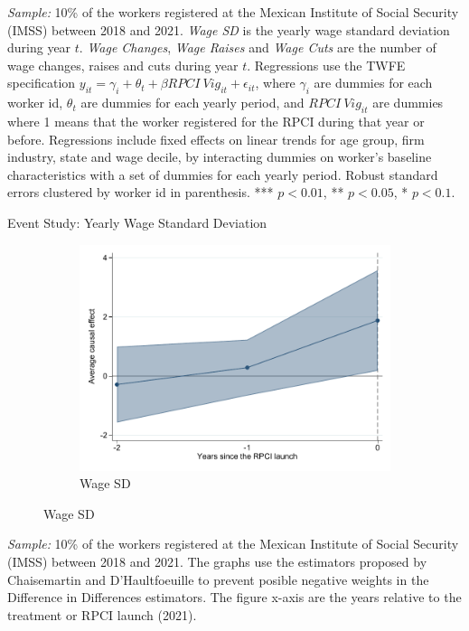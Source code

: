 \documentclass[oneside,11pt]{article}
\begin{document}
\scriptsize{
\noindent \textit{Sample:} 10\% of the workers registered at the Mexican Institute of Social Security (IMSS) between 2018 and 2021. \textit{Wage SD} is the yearly wage standard deviation during year $t$. \textit{Wage Changes}, \textit{Wage Raises} and \textit{Wage Cuts} are the number of wage changes, raises and cuts during year $t$. Regressions use the TWFE specification $y_{it} = \gamma_{i} + \theta_{t}+ \beta RPCI\ Vig_{it} +\epsilon_{it}$, where $\gamma_{i}$ are dummies for each worker id, $\theta_{t}$ are dummies for each yearly period, and $RPCI\ Vig_{it}$ are dummies where 1 means that the worker registered for the RPCI during that year or before. Regressions include fixed effects on linear trends for age group, firm industry, state and wage decile, by interacting dummies on worker's baseline characteristics with a set of dummies for each yearly period. Robust standard errors clustered by worker id in parenthesis. *** $p<0.01$, ** $p<0.05$, * $p<0.1$.}

\normalsize

\clearpage

Event Study: Yearly Wage Standard Deviation

\begin{figure}[H]
    \caption{Event studies - RPCI effect on wage volatility}
    \label{event_study_sal_cierre_sd_yr}
    \begin{center}
    
    \begin{subfigure}{0.49\textwidth}
    \caption{Wage SD}
    \includegraphics[width=\textwidth]{04_Figures/muestra_10porciento/event_study_sal_cierre_sd_yr_chaisemartin.pdf}
    \end{subfigure}
    
    \end{center}
\end{figure}
\scriptsize{
\noindent \textit{Sample:} 10\% of the workers registered at the Mexican Institute of Social Security (IMSS) between 2018 and 2021. The graphs use the estimators proposed by Chaisemartin and D'Haultfoeuille to prevent posible negative weights in the Difference in Differences estimators. The figure x-axis are the years relative to the treatment or RPCI launch (2021).
}
\end{document}

